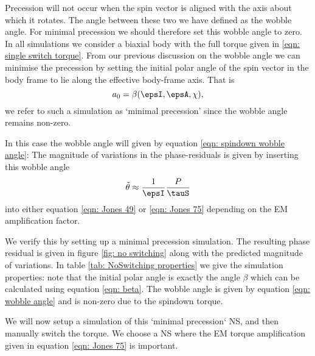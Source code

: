 Precession will not occur when the spin vector is aligned with the axis about
which it rotates. The angle between these two we have defined as the wobble
angle.  For minimal precession we should therefore set this wobble angle to
zero. In all simulations we consider a biaxial body with the full torque given
in \eqref{eqn: single switch torque}. From our previous discussion on the 
wobble angle we can minimise the precession by setting the initial polar angle
of the spin vector in the body frame to lie along the effective body-frame 
axis. That is
\begin{equation}
a_{0} = \beta(\epsI, \epsA, \chi),
\end{equation}
we refer to such a simulation as `minimal precession' since the wobble angle 
remains non-zero.

In this case the wobble angle will given by equation \eqref{eqn: spindown wobble angle}:
The magnitude of variations in the phase-residuals is given by inserting this
wobble angle
\begin{equation}
\wobbleangle \approx \frac{1}{\epsI}{\frac{P}{\tauS}}
\end{equation} 
into either equation \eqref{eqn: Jones 49} or \eqref{eqn: Jones 75} depending 
on the EM amplification factor.

We verify this by setting up a minimal precession simulation. The resulting
phase residual is given in figure \ref{fig: no switching} along with the
predicted magnitude of variations. In table \ref{tab: NoSwitching properties}
we give the simulation properties: note that the initial polar angle is exactly
the angle $\beta$ which can be calculated using equation \eqref{eqn: beta}. 
The wobble angle is given by equation \eqref{eqn: wobble angle} and is non-zero
due to the spindown torque. 

\begin{figure}[htb]
\begin{floatrow}
\capbtabbox{%
  
}{%
  \caption{}%
  \label{tab: NoSwitching properties}
}
\end{floatrow}
\end{figure}


We will now setup a simulation of this `minimal precession` NS, and then 
manually switch the torque. We choose a NS where the EM torque amplification
given in equation \eqref{eqn: Jones 75} is important.

